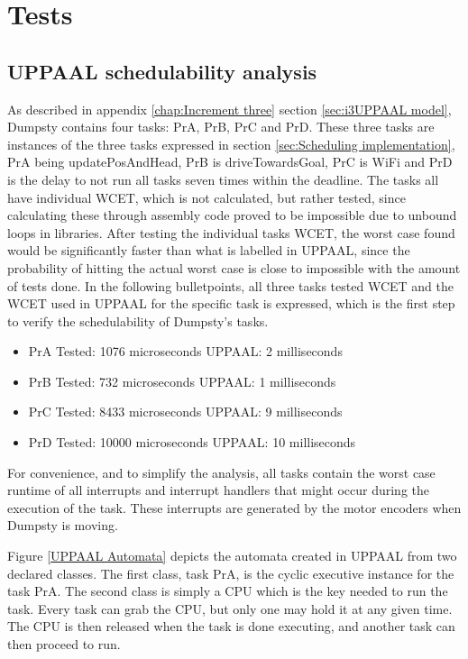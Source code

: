 \chapter{Tests}
\label{chap:Tests}


\section{UPPAAL schedulability analysis}
\label{sec:UPPAAL schedulability}
As described in appendix \ref{chap:Increment three} section  \ref{sec:i3UPPAAL model}, Dumpsty contains four tasks: PrA, PrB, PrC and PrD. These three tasks are instances of the three tasks expressed in section \ref{sec:Scheduling implementation}, PrA being updatePosAndHead, PrB is driveTowardsGoal, PrC is WiFi and PrD is the delay to not run all tasks seven times within the deadline.
The tasks all have individual WCET, which is not calculated, but rather tested, since calculating these through assembly code proved to be impossible due to unbound loops in libraries. After testing the individual tasks WCET, the worst case found would be significantly faster than what is labelled in UPPAAL, since the probability of hitting the actual worst case is close to impossible with the amount of tests done. In the following bulletpoints, all three tasks tested WCET and the WCET used in UPPAAL for the specific task is expressed, which is the first step to verify the schedulability of Dumpsty's tasks.


\begin{itemize}
	\item PrA \tab Tested: 1076 microseconds \tab UPPAAL: 2 milliseconds
	\item PrB \tab Tested: 732  microseconds \tab UPPAAL: 1 milliseconds
	\item PrC \tab Tested: 8433 microseconds \tab UPPAAL: 9 milliseconds
	\item PrD \tab Tested: 10000 microseconds \tab UPPAAL: 10 milliseconds
\end{itemize}


For convenience, and to simplify the analysis, all tasks contain the worst case runtime of all interrupts and interrupt handlers that might occur during the execution of the task. These interrupts are generated by the motor encoders when Dumpsty is moving.


Figure \ref{UPPAAL Automata} depicts the automata created in UPPAAL from two declared classes. The first class, task PrA, is the cyclic executive instance for the task PrA. The second class is simply a CPU which is the key needed to run the task. Every task can grab the CPU, but only one may hold it at any given time. The CPU is then released when the task is done executing, and another task can then proceed to run.


